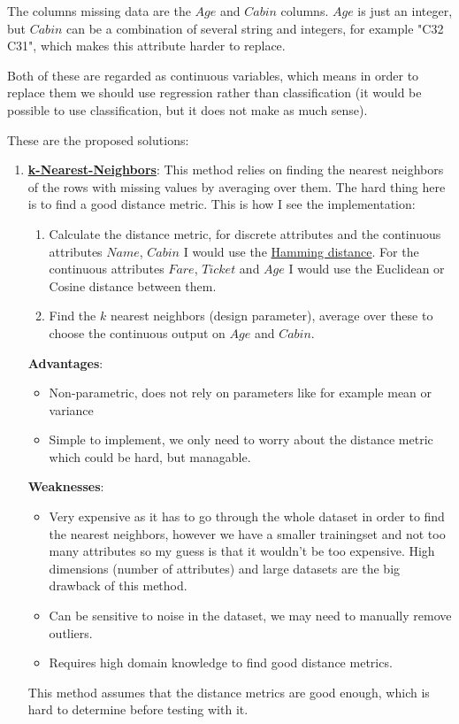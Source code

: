 \documentclass[11pt, english]{../Template/NTNUoving}
\begin{document}
\begin{oppgave}

    The columns missing data are the $Age$ and $Cabin$ columns.
    $Age$ is just an integer, but $Cabin$ can be a combination of several
    string and integers, for example "C32 C31", which makes this attribute harder to replace.

    Both of these are regarded as continuous variables, which means in order to replace them we should use
    regression rather than classification (it would be possible to use classification, but it does not make as much sense).

    These are the proposed solutions:

    \begin{enumerate}

        \item \textbf{\href{https://en.wikipedia.org/wiki/K-nearest_neighbors_algorithm}{k-Nearest-Neighbors}}: This method relies on finding the nearest neighbors of the rows with missing values by averaging over them. The hard thing here is to find a good distance metric.
        This is how I see the implementation:
        \begin{enumerate}
            \item Calculate the distance metric, for discrete attributes and the continuous attributes $Name$, $Cabin$ I would use the \href{https://en.wikipedia.org/wiki/Hamming_distance}{Hamming distance}. For the continuous attributes $Fare$, $Ticket$ and $Age$ I would use the Euclidean or Cosine distance between them.
            \item Find the $k$ nearest neighbors (design parameter), average over these to choose the continuous output on $Age$ and $Cabin$.
        \end{enumerate}
        \textbf{Advantages}:
        \begin{itemize}
            \item Non-parametric, does not rely on parameters like for example mean or variance
            \item Simple to implement, we only need to worry about the distance metric which could be hard, but managable.
        \end{itemize}
        \textbf{Weaknesses}:
        \begin{itemize}
            \item Very expensive as it has to go through the whole dataset in order to find the nearest neighbors, however we have a smaller trainingset and not too many attributes so my guess is that it wouldn't be too expensive.
            High dimensions (number of attributes) and large datasets are the big drawback of this method.
            \item Can be sensitive to noise in the dataset, we may need to manually remove outliers.
            \item Requires high domain knowledge to find good distance metrics.
        \end{itemize}
        This method assumes that the distance metrics are good enough, which is hard to determine before testing with it.


\end{enumerate}
\end{oppgave}
\end{document}
